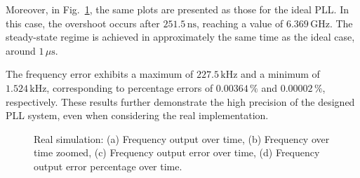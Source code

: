 \documentclass[lettersize,journal]{IEEEtran}
\begin{document}
Moreover, in Fig.~\ref{fig:freq_VCO_real_and_zoom}, the same plots are presented as those for the ideal PLL. In this case, the overshoot occurs after \(251.5 \, \text{ns}\), reaching a value of \(6.369 \, \text{GHz}\). The steady-state regime is achieved in approximately the same time as the ideal case, around \(1 \, \mu\text{s}\). 

The frequency error exhibits a maximum of \(227.5 \, \text{kHz}\) and a minimum of \(1.524 \, \text{kHz}\), corresponding to percentage errors of \(0.00364 \, \%\) and \(0.00002 \, \%\), respectively. These results further demonstrate the high precision of the designed PLL system, even when considering the real implementation.

\begin{figure}[!ht]
    \centering
    \hfil
    \hfil
    \hfil
    \hfil
    \caption{Real simulation: (a) Frequency output over time, (b) Frequency over time zoomed, (c) Frequency output error over time, (d) Frequency output error percentage over time.}
    \label{fig:freq_VCO_real_and_zoom}
\end{figure}
\end{document}
